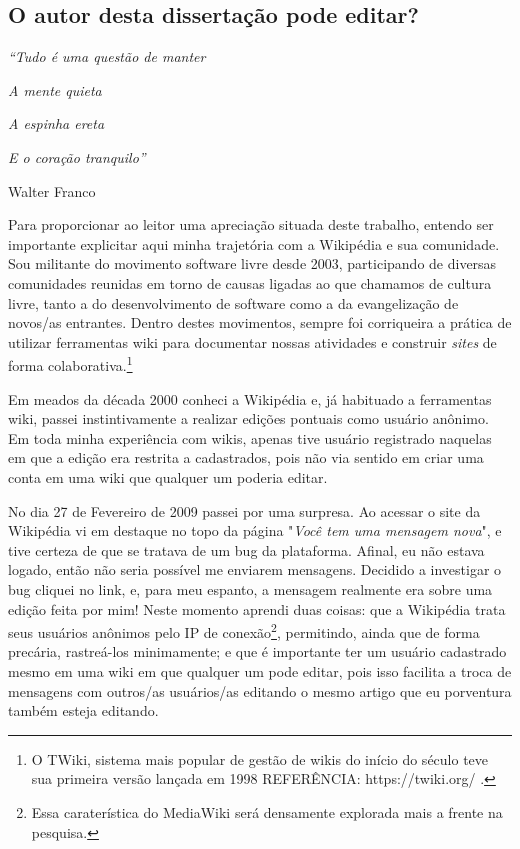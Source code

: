 \subsection{O autor desta dissertação pode editar?}

\singlespacing
\begin{flushright}

\textit{``Tudo é uma questão de manter}

\textit{A mente quieta}

\textit{A espinha ereta}

\textit{E o coração tranquilo''}

Walter Franco

\end{flushright}
\doublespacing

Para proporcionar ao leitor uma apreciação situada deste trabalho, entendo ser importante explicitar aqui minha trajetória com a Wikipédia e sua comunidade. Sou militante do movimento software livre desde 2003, participando de diversas comunidades reunidas em torno de causas ligadas ao que chamamos de cultura livre, tanto a do desenvolvimento de software como a da evangelização de novos/as entrantes. Dentro destes movimentos, sempre foi corriqueira a prática de utilizar ferramentas wiki para documentar nossas atividades e construir \textit{sites} de forma colaborativa.\footnote{O TWiki, sistema mais popular de gestão de wikis do início do século teve sua primeira versão lançada em 1998 REFERÊNCIA: https://twiki.org/ .}

Em meados da década 2000 conheci a Wikipédia e, já habituado a ferramentas wiki, passei instintivamente a realizar edições pontuais como usuário anônimo. Em toda minha experiência com wikis, apenas tive usuário registrado naquelas em que a edição era restrita a cadastrados, pois não via sentido em criar uma conta em uma wiki que qualquer um poderia editar.

No dia 27 de Fevereiro de 2009 passei por uma surpresa. Ao acessar o site da Wikipédia vi em destaque no topo da página "\textit{Você tem uma mensagem nova}", e tive certeza de que se tratava de um bug da plataforma. Afinal, eu não estava logado, então não seria possível me enviarem mensagens. Decidido a investigar o bug cliquei no link, e, para meu espanto, a mensagem realmente era sobre uma edição feita por mim! Neste momento aprendi duas coisas: que a Wikipédia trata seus usuários anônimos pelo IP de conexão\footnote{Essa caraterística do MediaWiki será densamente explorada mais a frente na pesquisa.}, permitindo, ainda que de forma precária, rastreá-los minimamente; e que é importante ter um usuário cadastrado mesmo em uma wiki em que qualquer um pode editar, pois isso facilita a troca de mensagens com outros/as usuários/as editando o mesmo artigo que eu porventura também esteja editando.


